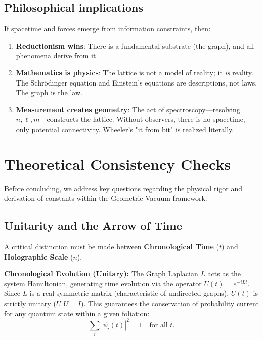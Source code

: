 \documentclass[aps,prd,twocolumn,superscriptaddress,groupedaddress,showpacs]{revtex4-2}
\begin{document}
\subsection{Philosophical implications}

If spacetime and forces emerge from information constraints, then:
\begin{enumerate}
\item \textbf{Reductionism wins}: There is a fundamental substrate (the graph), and all phenomena derive from it.

\item \textbf{Mathematics is physics}: The lattice is not a model of reality; it \emph{is} reality. The Schrödinger equation and Einstein's equations are descriptions, not laws. The graph is the law.

\item \textbf{Measurement creates geometry}: The act of spectroscopy---resolving $n, \ell, m$---constructs the lattice. Without observers, there is no spacetime, only potential connectivity. Wheeler's "it from bit" is realized literally.
\end{enumerate}

\section{Theoretical Consistency Checks}

Before concluding, we address key questions regarding the physical rigor and derivation of constants within the Geometric Vacuum framework.

\subsection{Unitarity and the Arrow of Time}

A critical distinction must be made between \textbf{Chronological Time} ($t$) and \textbf{Holographic Scale} ($n$).

\textbf{Chronological Evolution (Unitary):} The Graph Laplacian $L$ acts as the system Hamiltonian, generating time evolution via the operator $U(t) = e^{-iLt}$. Since $L$ is a real symmetric matrix (characteristic of undirected graphs), $U(t)$ is strictly unitary ($U^\dagger U = I$). This guarantees the conservation of probability current for any quantum state within a given foliation:
\begin{equation}
\sum_i |\psi_i(t)|^2 = 1 \quad \text{for all } t.
\end{equation}
\end{document}
